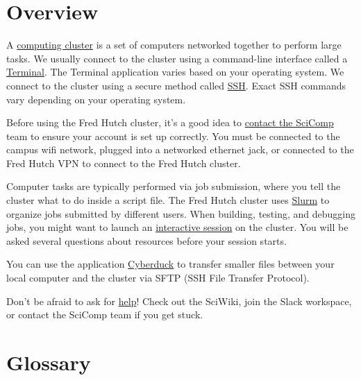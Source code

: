 \documentclass[
]{book}
\begin{document}
\hypertarget{overview}{%
\section{Overview}\label{overview}}

A \protect\hyperlink{what-is-a-cluster}{computing cluster} is a set of computers networked together to perform large tasks. We usually connect to the cluster using a command-line interface called a \protect\hyperlink{terminal}{Terminal}. The Terminal application varies based on your operating system. We connect to the cluster using a secure method called \protect\hyperlink{logging-in}{SSH}. Exact SSH commands vary depending on your operating system.

Before using the Fred Hutch cluster, it's a good idea to \protect\hyperlink{account-setup}{contact the SciComp} team to ensure your account is set up correctly. You must be connected to the campus wifi network, plugged into a networked ethernet jack, or connected to the Fred Hutch VPN to connect to the Fred Hutch cluster.

Computer tasks are typically performed via job submission, where you tell the cluster what to do inside a script file. The Fred Hutch cluster uses \protect\hyperlink{submit-your-first-job}{Slurm} to organize jobs submitted by different users. When building, testing, and debugging jobs, you might want to launch an \protect\hyperlink{interactive-session}{interactive session} on the cluster. You will be asked several questions about resources before your session starts.

You can use the application \protect\hyperlink{file-upload-and-download}{Cyberduck} to transfer smaller files between your local computer and the cluster via SFTP (SSH File Transfer Protocol).

Don't be afraid to ask for \protect\hyperlink{help}{help}! Check out the SciWiki, join the Slack workspace, or contact the SciComp team if you get stuck.

\hypertarget{glossary}{%
\section{Glossary}\label{glossary}}
\end{document}
